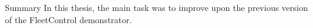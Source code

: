 \chap Summary
In this thesis, the main task was to improve upon the previous version of the FleetControl demonstrator.